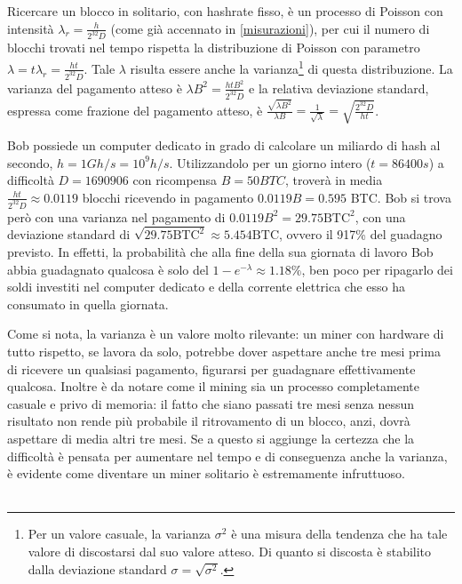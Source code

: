 Ricercare un blocco in solitario, con hashrate fisso, è un processo di Poisson con intensità $\lambda_r = \frac{h}{2^{32}D}$ (come già accennato in \ref{misurazioni}), per cui il numero di blocchi trovati nel tempo rispetta la distribuzione di Poisson con parametro $\lambda = t\lambda_r = \frac{ht}{2^{32}D}$.
Tale $\lambda$ risulta essere anche la varianza\footnote{Per un valore casuale, la varianza $\sigma^2$ è una misura della tendenza che ha tale valore di discostarsi dal suo valore atteso. Di quanto si discosta è stabilito dalla deviazione standard $\sigma = \sqrt{\sigma^2}$.} di questa distribuzione. La varianza del pagamento atteso è $\lambda B^2 = \frac{htB^2}{2^{32}D}$ e la relativa deviazione standard, espressa come frazione del pagamento atteso, è $\frac{\sqrt{\lambda B^2}}{\lambda B} = \frac{1}{\sqrt{\lambda}} = \sqrt{\frac{2^{32}D}{ht}}$.

\begin{esempio}
Bob possiede un computer dedicato in grado di calcolare un miliardo di hash al secondo, $h = 1Gh/s = 10^9 h/s$. Utilizzandolo per un giorno intero ($t = 86400s$) a difficoltà $D = 1690906$ con ricompensa $B = 50BTC$, troverà in media $\frac{ht}{2^{32}D} \approx 0.0119$ blocchi ricevendo in pagamento $0.0119B = 0.595$ BTC.
Bob si trova però con una varianza nel pagamento di $0.0119B^2 = 29.75 \text{BTC}^2$, con una deviazione standard di $\sqrt{29.75 \text{BTC}^2} \approx 5.454 \text{BTC}$, ovvero il 917\% del guadagno previsto. In effetti, la probabilità che alla fine della sua giornata di lavoro Bob abbia guadagnato qualcosa è solo del $1 - e^{-\lambda} \approx 1.18\%$, ben poco per ripagarlo dei soldi investiti nel computer dedicato e della corrente elettrica che esso ha consumato in quella giornata.
\end{esempio}

Come si nota, la varianza è un valore molto rilevante: un miner con hardware di tutto rispetto, se lavora da solo, potrebbe dover aspettare anche tre mesi prima di ricevere un qualsiasi pagamento, figurarsi per guadagnare effettivamente qualcosa. Inoltre è da notare come il mining sia un processo completamente casuale e privo di memoria: il fatto che siano passati tre mesi senza nessun risultato non rende più probabile il ritrovamento di un blocco, anzi, dovrà aspettare di media altri tre mesi. Se a questo si aggiunge la certezza che la difficoltà è pensata per aumentare nel tempo e di conseguenza anche la varianza, è evidente come diventare un miner solitario è estremamente infruttuoso. \\\\

